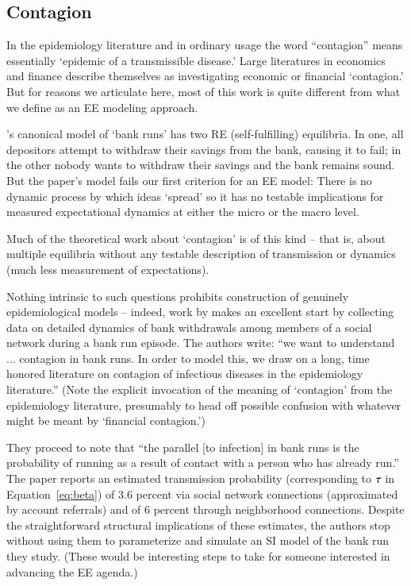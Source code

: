 
\subsection{Contagion}\label{subsec:Contagion}

In the epidemiology literature and in ordinary usage the word ``contagion'' means essentially `epidemic of a transmissible disease.'  Large literatures in economics and finance describe themselves as investigating economic or financial `contagion.'  But for reasons we articulate here, most of this work is quite different from what we define as an EE modeling approach.


\href{https://www.jstor.org/stable/1837095}{\cite{diamond_bank_1983}}'s canonical model of `bank runs' has two RE (self-fulfilling) equilibria.  In one, all depositors attempt to withdraw their savings from the bank, causing it to fail; in the other nobody wants to withdraw their savings and the bank remains sound.  But the paper's model fails our first criterion for an EE model: There is no dynamic process by which ideas `spread' so it has no testable implications for measured expectational dynamics at either the micro or the macro level.

Much of the theoretical work about `contagion' is of this kind -- that is, about multiple equilibria without any testable description of transmission or dynamics (much less measurement of expectations).

Nothing intrinsic to such questions prohibits construction of genuinely epidemiological models -- indeed, work by \cite{iyer2012understanding} makes an excellent start by collecting data on detailed dynamics of bank withdrawals among members of a social network during a bank run episode.  The authors write:
``we want to understand ... contagion in bank runs. In order to model this, we draw on a long, time honored literature on contagion of infectious diseases in the epidemiology literature.''   (Note the explicit invocation of the meaning of `contagion' from the epidemiology literature, presumably to head off possible confusion with whatever might be meant by `financial contagion.')

They proceed to note that ``the parallel [to infection] in bank runs is the probability of running as a result of contact with a person who has already run.''  The paper reports an estimated transmission probability (corresponding to  $\tranProb$ in Equation~\ref{eq:beta}) of 3.6 percent via social network connections (approximated by account referrals) and of 6 percent through neighborhood connections. Despite the straightforward structural implications of these estimates, the authors stop without using them to parameterize and simulate an SI model of the bank run they study. (These would be interesting steps to take for someone interested in advancing the EE agenda.)


